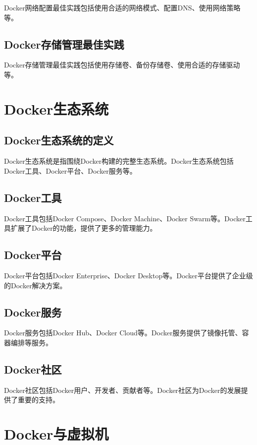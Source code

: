 \documentclass[12pt,UTF8]{ctexbook}
\begin{document}
Docker网络配置最佳实践包括使用合适的网络模式、配置DNS、使用网络策略等。

\section{Docker存储管理最佳实践}

Docker存储管理最佳实践包括使用存储卷、备份存储卷、使用合适的存储驱动等。

\chapter{Docker生态系统}

\section{Docker生态系统的定义}

Docker生态系统是指围绕Docker构建的完整生态系统。Docker生态系统包括Docker工具、Docker平台、Docker服务等。

\section{Docker工具}

Docker工具包括Docker Compose、Docker Machine、Docker Swarm等。Docker工具扩展了Docker的功能，提供了更多的管理能力。

\section{Docker平台}

Docker平台包括Docker Enterprise、Docker Desktop等。Docker平台提供了企业级的Docker解决方案。

\section{Docker服务}

Docker服务包括Docker Hub、Docker Cloud等。Docker服务提供了镜像托管、容器编排等服务。

\section{Docker社区}

Docker社区包括Docker用户、开发者、贡献者等。Docker社区为Docker的发展提供了重要的支持。

\chapter{Docker与虚拟机}
\end{document}
